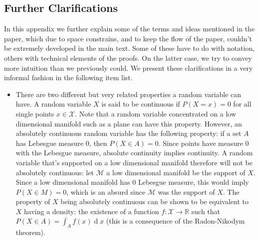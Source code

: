\documentclass{article} %
\newcommand\manM{\mathcal{M}}
\newcommand\RR{\mathbb{R}}
\renewcommand{\d}[1]{\ensuremath{\operatorname{d}\!{#1}}}
\theoremstyle{definition}
\begin{document}
\begin{appendices}
\section{Further Clarifications} \label{app::clarifications}
In this appendix we further explain some of the
terms and ideas mentioned in the paper, which due to space
constrains, and to keep the flow of the paper, couldn't
be extremely developed in the main text. Some of these
have to do with notation, others with technical elements
of the proofs. On the latter case, we try to convey more intuition
than we previously could. We present these clarifications
in a very informal fashion in the following item list.
\begin{itemize}
  \item There are two different but very related properties a random
 variable can have. A random variable $X$ is said to be continuous if $P(X = x) = 0$
for all single points $x \in \mathcal{X}$. Note that a random variable concentrated
on a low dimensional manifold such as a plane can have this property.
However, an absolutely continuous random variable has the following
property: if a set $A$ has Lebesgue measure 0, then $P(X \in A) = 0$.
Since points have measure 0 with the Lebesgue measure, absolute continuity
implies continuity. A random variable that's supported on a low dimensional
manifold therefore will not be absolutely continuous: let $\manM$ a low
dimensional manifold be the support of $X$. Since a low dimensional
manifold has 0 Lebesgue measure, this would imply $P(X \in M) = 0$, which
is an absurd since $\manM$ was the support of $X$. The property of $X$ being
absolutely continuous can be shown to be equivalent to $X$ having a density:
the existence of a function $f: \mathcal{X} \rightarrow \RR$ such that
$P(X \in A) = \int_A f(x) \d x$
(this is a consequence of the Radon-Nikodym theorem). 


\end{itemize}
\end{appendices}
\end{document}
